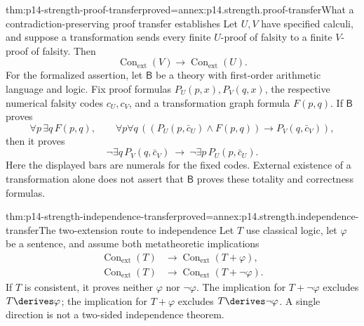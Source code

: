 \begin{hbtheorem}{thm:p14-strength-proof-transfer}{proved=annex:p14.strength.proof-transfer}{What a contradiction-preserving proof transfer establishes}
Let \(U,V\) have specified calculi, and suppose a transformation sends
every finite \(U\)-proof of falsity to a finite \(V\)-proof of falsity.
Then
\[
 \operatorname{Con}_{\mathrm{ext}}(V)\longrightarrow
 \operatorname{Con}_{\mathrm{ext}}(U).
\]
For the formalized assertion, let \(\mathsf B\) be a theory with first-order
arithmetic language and logic. Fix proof formulas \(P_U(p,x),P_V(q,x)\),
the respective numerical falsity codes \(c_U,c_V\), and a transformation
graph formula \(F(p,q)\). If \(\mathsf B\) proves
\[
 \forall p\,\exists q\,F(p,q),\qquad
 \forall p\forall q\,
 ((P_U(p,\bar c_U)\land F(p,q))\to P_V(q,\bar c_V)),
\]
then it proves
\[
 \neg\exists q\,P_V(q,\bar c_V)\ \to\
 \neg\exists p\,P_U(p,\bar c_U).
\]
Here the displayed bars are numerals for the fixed codes. External existence
of a transformation alone does not assert that \(\mathsf B\) proves these
totality and correctness formulas.
\end{hbtheorem}

\begin{hbtheorem}{thm:p14-strength-independence-transfer}{proved=annex:p14.strength.independence-transfer}{The two-extension route to independence}
Let \(T\) use classical logic, let \(\varphi\) be a sentence, and assume
both metatheoretic implications
\[
\begin{aligned}
 \operatorname{Con}_{\mathrm{ext}}(T)&\to
       \operatorname{Con}_{\mathrm{ext}}(T+\varphi),\\
 \operatorname{Con}_{\mathrm{ext}}(T)&\to
       \operatorname{Con}_{\mathrm{ext}}(T+\neg\varphi).
\end{aligned}
\]
If \(T\) is consistent, it proves neither \(\varphi\) nor
\(\neg\varphi\). The implication for \(T+\neg\varphi\) excludes
\(T\derives\varphi\); the implication for \(T+\varphi\) excludes
\(T\derives\neg\varphi\). A single direction is not a two-sided
independence theorem.
\end{hbtheorem}


